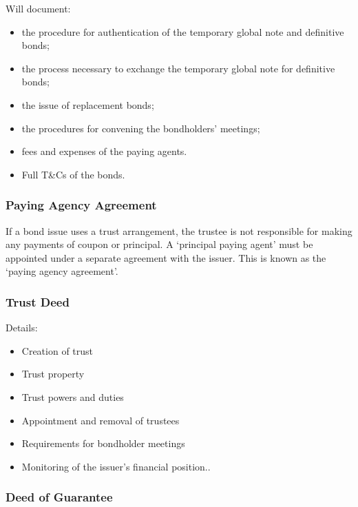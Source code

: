 \documentclass[
]{article}
\providecommand{\tightlist}{%
  \setlength{\itemsep}{0pt}\setlength{\parskip}{0pt}}
\begin{document}
Will document:

\begin{itemize}
\tightlist
\item
  the procedure for authentication of the temporary global note and
  definitive bonds;
\item
  the process necessary to exchange the temporary global note for
  definitive bonds;
\item
  the issue of replacement bonds;
\item
  the procedures for convening the bondholders' meetings;
\item
  fees and expenses of the paying agents.
\item
  Full T\&Cs of the bonds.
\end{itemize}

\hypertarget{paying-agency-agreement}{%
\subsubsection{Paying Agency Agreement}\label{paying-agency-agreement}}

If a bond issue uses a trust arrangement, the trustee is not responsible
for making any payments of coupon or principal. A `principal paying
agent' must be appointed under a separate agreement with the issuer.
This is known as the `paying agency agreement'.

\hypertarget{trust-deed}{%
\subsubsection{Trust Deed}\label{trust-deed}}

Details:

\begin{itemize}
\tightlist
\item
  Creation of trust
\item
  Trust property
\item
  Trust powers and duties
\item
  Appointment and removal of trustees
\item
  Requirements for bondholder meetings
\item
  Monitoring of the issuer's financial position..
\end{itemize}

\hypertarget{deed-of-guarantee}{%
\subsubsection{Deed of Guarantee}\label{deed-of-guarantee}}
\end{document}
